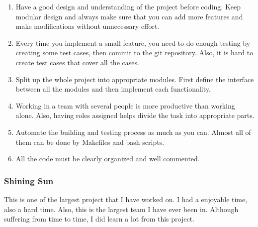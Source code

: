 \begin{enumerate}
\item
Have a good design and understanding of the project before coding. Keep modular design and
always make sure that you can add more features and make modifications without unnecessary
effort.
\item
Every time you implement a small feature, you need to do enough testing by creating some test
cases, then commit to the git repository. Also, it is hard to create test cases that cover all
the cases.
\item
Split up the whole project into appropriate modules. First define the interface between all
the modules and then implement each functionality.
\item
Working in a team with several people is more productive than working alone. Also, having
roles assigned helps divide the task into appropriate parts.
\item
Automate the building and testing process as much as you can. Almost all of them can be done
by Makefiles and bash scripts.
\item
All the code must be clearly organized and well commented.
\end{enumerate}

\subsubsection{Shining Sun}

This is one of the largest project that I have worked on. I had a enjoyable time, also a hard
time. Also, this is the largest team I have ever been in. Although suffering from time to time,
I did learn  a lot from this project. 

